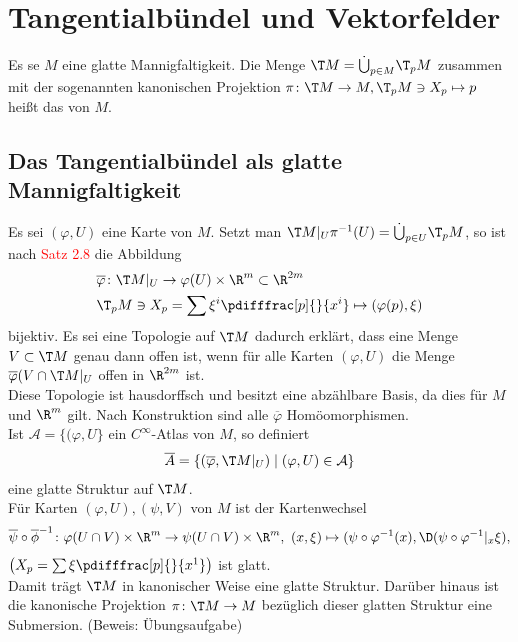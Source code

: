 
\section{Tangentialbündel und Vektorfelder}

\begin{dfn}[Tangentialbündel]
  Es se $M$ eine glatte Mannigfaltigkeit. Die Menge $\T M = \dot \bigcup_{p \in M}\T_pM$ zusammen mit der sogenannten kanonischen Projektion $\pi \colon \T M \to M, \T_pM \ni X_p \mapsto p$ heißt das  von $M$.
\end{dfn}

\subsection{Das Tangentialbündel als glatte Mannigfaltigkeit}

Es sei $(\varphi, U)$ eine Karte von $M$. Setzt man $\T M|_U  \pi^{-1}(U) = \dot \bigcup_{p\in U}\T_pM$, so ist nach \textcolor{red}{Satz 2.8} %
die Abbildung
\begin{align*}
  & \overline \varphi \colon \T M|_U \to \varphi(U) \times \R^m \subset \R^{2m}\\
&\T_p M \ni X_p = \sum \xi^i\pdifffrac[p]{}{x^i} \mapsto (\varphi(p),\xi)
\end{align*}
bijektiv.
Es sei eine Topologie auf $\T M$ dadurch erklärt, dass eine Menge $V \subset \T M$ genau dann offen ist, wenn für alle Karten $(\varphi, U)$ die Menge $\overline \varphi(V \cap \T M|_U$ offen in $\R^{2m}$ ist.\\
Diese Topologie ist hausdorffsch und besitzt eine abzählbare Basis, da dies für $M$ und $\R^m$ gilt.
Nach Konstruktion sind alle $\overline \varphi$ Homöomorphismen.\\
Ist $\mathcal A = \{(\varphi, U\}$ ein $C^{\infty}$-Atlas von $M$, so definiert
\begin{align*}
  \overline A = \{(\overline \varphi, \T M|_U) \mid (\varphi, U) \in \mathcal A\}
\end{align*}
eine glatte Struktur auf $\T M$.\\
Für Karten $(\varphi, U), (\psi, V)$ von $M$ ist der Kartenwechsel
\begin{align*}
  \overline \psi \circ \overline \phi^{-1} \colon \varphi(U \cap V) \times \R^m \to \psi(U \cap V) \times \R^m, \ (x, \xi) \mapsto (\psi \circ \varphi^{-1}(x),\D(\psi \circ \varphi^{-1}|_x\xi),
\end{align*}
$\left(X_p = \sum \xi \pdifffrac[p]{}{x^1}\right)$ ist glatt.\\
Damit trägt $\T M$ in kanonischer Weise eine glatte Struktur.
Darüber hinaus ist die kanonische Projektion $\pi \colon \T M \to M$ bezüglich dieser glatten Struktur eine Submersion. (Beweis: Übungsaufgabe)\\

